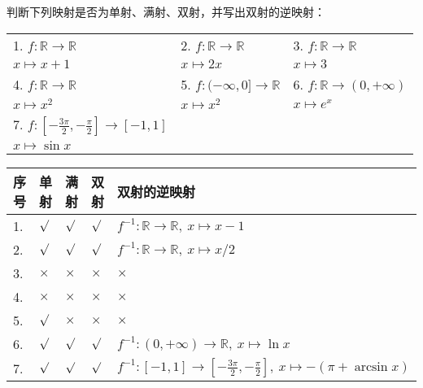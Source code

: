 	\begin{exercise}[0.3.1]
		判断下列映射是否为单射、满射、双射，并写出双射的逆映射：
		\begin{table}[htbp]
			\centering
			\begin{tabular}{p{0.3\textwidth}p{}p{}}
				1. $f: \mathbb{R}\rightarrow\mathbb{R}$&2. $f: \mathbb{R}\rightarrow\mathbb{R}$&3. $f: \mathbb{R}\rightarrow\mathbb{R}$\\
				\hspace{3em}$x\mapsto x+1$&\hspace{3em}$x\mapsto 2x$&\hspace{3em}$x\mapsto 3$\\
				4. $f: \mathbb{R}\rightarrow\mathbb{R}$&5. $f: (-\infty,0]\rightarrow\mathbb{R}$&6. $f: \mathbb{R}\rightarrow(0,+\infty)$\\
				\hspace{3em}$x\mapsto x^2$&\hspace{3em}$x\mapsto x^2$&\hspace{3em}$x\mapsto e^{x}$\\
				7. $f: \left[-\frac{3\pi}{2},-\frac{\pi}{2}\right]\rightarrow[-1,1]$&&\\
				\hspace{3em}$x\mapsto\sin{x}$&&
			\end{tabular}
		\end{table}
	\end{exercise}
	\begin{solution}
		\begin{table}[htbp]
			\centering
			\begin{tabular}{p{0.05\textwidth}p{}p{}p{}p{}}
				\toprule
				序号&单射&满射&双射&双射的逆映射\\
				\midrule
				1.&$\surd$&$\surd$&$\surd$&$f^{-1}: \mathbb{R}\rightarrow\mathbb{R},\ x\mapsto x-1$\\
				2.&$\surd$&$\surd$&$\surd$&$f^{-1}: \mathbb{R}\rightarrow\mathbb{R},\ x\mapsto x/2$\\
				3.&$\times$&$\times$&$\times$&$\times$\\
				4.&$\times$&$\times$&$\times$&$\times$\\
				5.&$\surd$&$\times$&$\times$&$\times$\\
				6.&$\surd$&$\surd$&$\surd$&$f^{-1}: (0,+\infty)\rightarrow\mathbb{R},\ x\mapsto \ln{x}$\\
				7.&$\surd$&$\surd$&$\surd$&$f^{-1}:  [-1,1]\rightarrow\left[-\frac{3\pi}{2},-\frac{\pi}{2}\right],\ x\mapsto -(\pi+\arcsin{x})$\\
				\bottomrule
			\end{tabular}
		\end{table}
	\end{solution}
	
